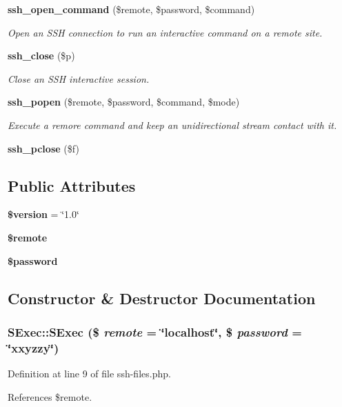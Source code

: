 \begin{CompactItemize}
{\bf ssh\_\-open\_\-command} (\$remote, \$password, \$command)
\begin{CompactList}\small\item\em Open an SSH connection to run an interactive command on a remote site. \item\end{CompactList}\item 
{\bf ssh\_\-close} (\$p)
\begin{CompactList}\small\item\em Close an SSH interactive session. \item\end{CompactList}\item 
{\bf ssh\_\-popen} (\$remote, \$password, \$command, \$mode)
\begin{CompactList}\small\item\em Execute a remore command and keep an unidirectional stream contact with it. \item\end{CompactList}\item 
{\bf ssh\_\-pclose} (\$f)
\end{CompactItemize}
\subsection*{Public Attributes}
\begin{CompactItemize}
\item 
{\bf \$version} = \char`\"{}1.0\char`\"{}
\item 
{\bf \$remote}
\item 
{\bf \$password}
\end{CompactItemize}


\subsection{Constructor \& Destructor Documentation}
\subsubsection{\setlength{\rightskip}{0pt plus 5cm}SExec::SExec (\$ {\em remote} = \char`\"{}localhost\char`\"{}, \$ {\em password} = \char`\"{}xxyzzy\char`\"{})}\label{classSExec_a0}




Definition at line 9 of file ssh-files.php.

References \$remote.
